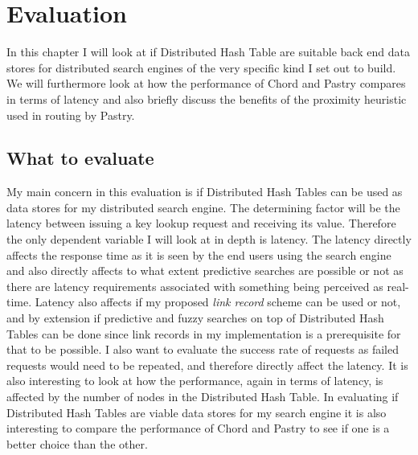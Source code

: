 

%
%
%
% 
%

\chapter{Evaluation}
In this chapter I will look at if Distributed Hash Table are suitable back end data stores for distributed search engines of the very specific kind I set out to build. We will furthermore look at how the performance of Chord and Pastry compares in terms of latency and also briefly discuss the benefits of the proximity heuristic used in routing by Pastry. 

\section{What to evaluate}
My main concern in this evaluation is if Distributed Hash Tables can be used as data stores for my distributed search engine. The determining factor will be the latency between issuing a key lookup request and receiving its value. Therefore the only dependent variable I will look at in depth is latency.
The latency directly affects the response time as it is seen by the end users using the search engine and also directly affects to what extent predictive searches are possible or not as there are latency requirements associated with something being perceived as real-time.
Latency also affects if my proposed \emph{link record} scheme can be used or not, and by extension if predictive and fuzzy searches on top of Distributed Hash Tables can be done since link records in my implementation is a prerequisite for that to be possible.
I also want to evaluate the success rate of requests as failed requests would need to be repeated, and therefore directly affect the latency.
It is also interesting to look at how the performance, again in terms of latency, is affected by the number of nodes in the Distributed Hash Table.
In evaluating if Distributed Hash Tables are viable data stores for my search engine it is also interesting to compare the performance of Chord and Pastry to see if one is a better choice than the other.

